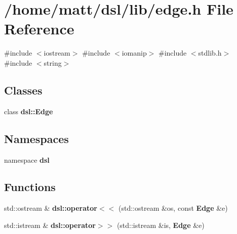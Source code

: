 \section{/home/matt/dsl/lib/edge.h \-File \-Reference}
\label{edge_8h}
{\ttfamily \#include $<$iostream$>$}\*
{\ttfamily \#include $<$iomanip$>$}\*
{\ttfamily \#include $<$stdlib.\-h$>$}\*
{\ttfamily \#include $<$string$>$}\*
\subsection*{\-Classes}
\begin{DoxyCompactItemize}
\item 
class {\bf dsl\-::\-Edge}
\end{DoxyCompactItemize}
\subsection*{\-Namespaces}
\begin{DoxyCompactItemize}
\item 
namespace {\bf dsl}
\end{DoxyCompactItemize}
\subsection*{\-Functions}
\begin{DoxyCompactItemize}
\item 
std\-::ostream \& {\bf dsl\-::operator$<$$<$} (std\-::ostream \&os, const {\bf \-Edge} \&e)
\item 
std\-::istream \& {\bf dsl\-::operator$>$$>$} (std\-::istream \&is, {\bf \-Edge} \&e)
\end{DoxyCompactItemize}
